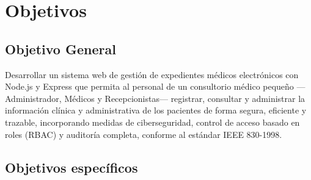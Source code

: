 \documentclass[11pt,a4paper]{article}
\begin{document}
\section{Objetivos}

\subsection{Objetivo General}

Desarrollar un sistema web de gestión de expedientes médicos electrónicos con Node.js y Express que permita al personal de un consultorio médico pequeño ---Administrador, Médicos y Recepcionistas--- registrar, consultar y administrar la información clínica y administrativa de los pacientes de forma segura, eficiente y trazable, incorporando medidas de ciberseguridad, control de acceso basado en roles (RBAC) y auditoría completa, conforme al estándar IEEE 830-1998.

\subsection{Objetivos específicos}
\end{document}
